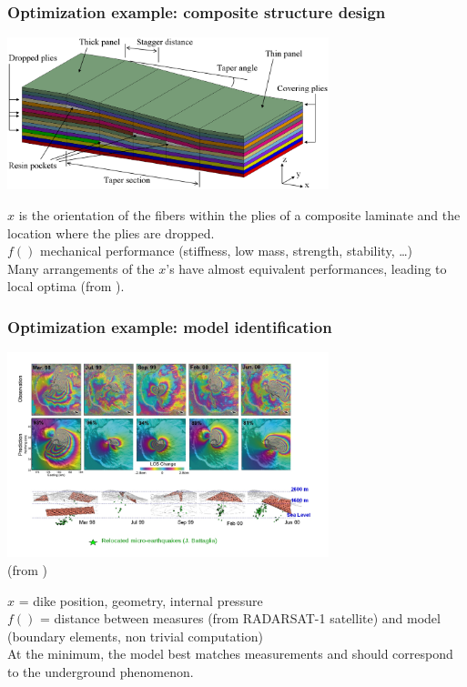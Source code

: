 \documentclass[12pt]{beamer}
\begin{document}
\begin{frame}
\frametitle{Optimization example: composite structure design}
\begin{center}
\includegraphics[width=0.7\textwidth]{ply_drop.png}
\end{center}
$x$ is the orientation of the fibers within the plies of a composite laminate and the location where the plies are dropped.
\\
$f()$ mechanical performance (stiffness, low mass, strength, stability, \ldots)
\\
Many arrangements of the $x$'s have almost equivalent performances, leading to local optima
(from \cite{irisarri2014optimal}).
\end{frame}

\begin{frame}
\frametitle{Optimization example: model identification}
\begin{center}
\includegraphics[width=0.7\textwidth]{piton_fournaise.jpg}\\
\vspace{-1cm}
{\hfill\tiny (from \cite{fukushima2010evolution})}
\end{center}
$x$ = dike position, geometry, internal pressure\\
$f()$ = distance between measures (from RADARSAT-1 satellite) and model (boundary elements, non trivial computation)\\
At the minimum, the model best matches measurements and should correspond to the underground phenomenon.
\end{frame}
\end{document}
